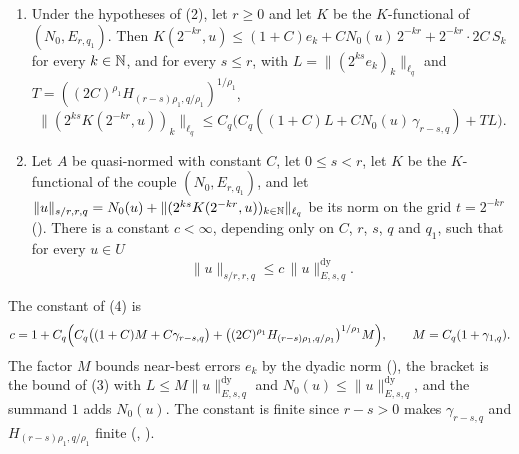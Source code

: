 \begin{theorem}
\begin{enumerate}
    $N_1(b_k) \leq 2^k$, and let $(e_k)_k$ be a decreasing sequence in $[0, \infty]$ with
    $N_0(u - b_k) \leq e_k$ for every $k \in \N$. Then for all $j, k \in \N$,
    $E(2^j, b_k) = 0$ if $j \geq k$ and $E(2^j, b_k) \leq 2 C e_j$ if $j < k$, and for every
    $r \in \R$ and $k \in \N$,
    \[
      \|b_k\|^{\mathrm{dy}}_{E, r, q_1} \leq C \bigl(e_k + N_0(u)\bigr) + 2 C \, S_k ,
      \qquad S_k = \Bigl( \sum_{j < k} (2^{jr} e_j)^{\rho_1} \Bigr)^{1/\rho_1} .
    \]
  \item Under the hypotheses of (2), let $r \geq 0$ and let $K$ be the $K$-functional of
    $(N_0, E_{r, q_1})$. Then
    $K(2^{-kr}, u) \leq (1 + C) e_k + C N_0(u) \, 2^{-kr} + 2^{-kr} \cdot 2 C \, S_k$ for every
    $k \in \N$, and for every $s \leq r$, with $L = \|(2^{ks} e_k)_k\|_{\ell_q}$ and
    $T = ((2C)^{\rho_1} H_{(r-s)\rho_1, q/\rho_1})^{1/\rho_1}$,
    \[
      \|(2^{ks} K(2^{-kr}, u))_k\|_{\ell_q}
      \leq C_q \bigl( C_q ( (1 + C) L + C N_0(u) \, \gamma_{r-s, q} ) + T L \bigr) .
    \]
  \item Let $A$ be quasi-normed with constant $C$, let $0 \leq s < r$, let $K$ be the
    $K$-functional of the couple $(N_0, E_{r, q_1})$, and let
    $\|u\|_{s/r, r, q} = N_0(u) + \|(2^{ks} K(2^{-kr}, u))_{k \in \mathbb{N}}\|_{\ell_q}$ be its norm on
    the grid $t = 2^{-kr}$ (). There is a constant $c < \infty$,
    depending only on $C$, $r$, $s$, $q$ and $q_1$, such that for every $u \in U$
    \[
      \|u\|_{s/r, r, q} \leq c \, \|u\|^{\mathrm{dy}}_{E, s, q} .
    \]
\end{enumerate}
\end{theorem}

The constant of (4) is
\[
  c = 1 + C_q \Bigl( C_q \bigl((1 + C) M + C \gamma_{r-s, q}\bigr)
    + \bigl((2C)^{\rho_1} H_{(r-s)\rho_1, q/\rho_1}\bigr)^{1/\rho_1} M \Bigr) ,
  \qquad M = C_q (1 + \gamma_{1, q}) .
\]
The factor $M$ bounds near-best errors $e_k$ by the dyadic norm (), the
bracket is the bound of (3) with $L \leq M \|u\|^{\mathrm{dy}}_{E, s, q}$ and
$N_0(u) \leq \|u\|^{\mathrm{dy}}_{E, s, q}$, and the summand $1$ adds $N_0(u)$. The constant is
finite since $r - s > 0$ makes $\gamma_{r-s, q}$ and $H_{(r-s)\rho_1, q/\rho_1}$ finite
(, ).

